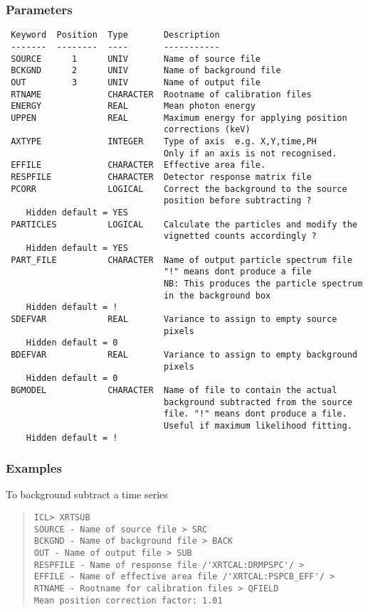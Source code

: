 \documentclass{book}
\renewcommand{\_}{{\tt\char'137}}     %
\begin{document}
\subsubsection{Parameters}
\begin{verbatim}
 Keyword  Position  Type       Description
 -------  --------  ----       -----------
 SOURCE      1      UNIV       Name of source file
 BCKGND      2      UNIV       Name of background file
 OUT         3      UNIV       Name of output file
 RTNAME             CHARACTER  Rootname of calibration files
 ENERGY             REAL       Mean photon energy
 UPPEN              REAL       Maximum energy for applying position
                               corrections (keV)
 AXTYPE             INTEGER    Type of axis  e.g. X,Y,time,PH
                               Only if an axis is not recognised.
 EFFILE             CHARACTER  Effective area file.
 RESPFILE           CHARACTER  Detector response matrix file
 PCORR              LOGICAL    Correct the background to the source
                               position before subtracting ?
    Hidden default = YES
 PARTICLES          LOGICAL    Calculate the particles and modify the
                               vignetted counts accordingly ?
    Hidden default = YES
 PART_FILE          CHARACTER  Name of output particle spectrum file
                               "!" means dont produce a file
                               NB: This produces the particle spectrum
                               in the background box
    Hidden default = !
 SDEFVAR            REAL       Variance to assign to empty source
                               pixels
    Hidden default = 0
 BDEFVAR            REAL       Variance to assign to empty background
                               pixels
    Hidden default = 0
 BGMODEL            CHARACTER  Name of file to contain the actual
                               background subtracted from the source
                               file. "!" means dont produce a file.
                               Useful if maximum likelihood fitting.
    Hidden default = !

\end{verbatim}\subsubsection{Examples}
To background subtract a time series
\begin{quote}\begin{verbatim}
ICL> XRTSUB
SOURCE - Name of source file > SRC
BCKGND - Name of background file > BACK
OUT - Name of output file > SUB
RESPFILE - Name of response file /'XRTCAL:DRMPSPC'/ >
EFFILE - Name of effective area file /'XRTCAL:PSPCB_EFF'/ >
RTNAME - Rootname for calibration files > QFIELD
Mean position correction factor: 1.01
\end{verbatim}\end{quote}
\end{document}
